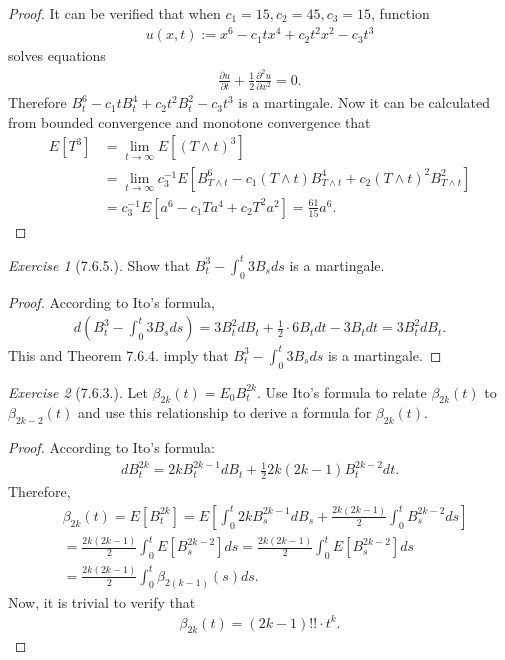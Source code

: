 \documentclass[12pt,a4paper]{amsart}
\theoremstyle{plain}
\theoremstyle{definition}
\theoremstyle{remark}
\newtheorem*{exe}{Exercise}
\numberwithin{equation}{section}
\begin{document}
\begin{proof}
It can be verified that when $c_1 = 15, c_2 = 45, c_3 = 15$, function 
\begin{align}
u(x,t):= x^6 - c_1 tx^4 + c_2 t^2 x^2 - c_3 t^3
\end{align}
solves equations
\begin{align}
\frac{\partial u}{\partial t} + \frac{1}{2} \frac{\partial^2 u}{ \partial x^2} = 0.
\end{align}
Therefore $B_t^6 - c_1tB_t^4+c_2t^2B_t^2-c_3t^3$ is a martingale.
Now it can be calculated from bounded convergence and monotone convergence that
\begin{align}
  E\left[ T^3 \right]
&= \lim_{t\to \infty} E\left[(T\wedge t)^3\right] 
  \\& =\lim_{t\to \infty} c_3^{-1}E\left[ B_{T\wedge t}^6 - c_1(T\wedge t)B_{T\wedge t}^4+c_2(T\wedge t)^2 B_{T\wedge t}^2 \right]
  \\& = c_3^{-1}E\left[ a^6 - c_1Ta^4+c_2T^2a^2 \right]
= \frac{61}{15}a^6.
\end{align}
\end{proof}
\begin{exe}[7.6.5.]
Show that $B_t^3 - \int_0^t 3B_s ds$ is a martingale.
\end{exe}
\begin{proof}
According to Ito's formula,
\begin{align}
 d\left( B_t^3 - \int_0^t 3 B_s ds \right)
= 3B_t^2 dB_t + \frac{1}{2} \cdot 6 B_t dt - 3 B_t dt
= 3 B_t^2 dB_t.
\end{align}
This and Theorem 7.6.4. imply that $B_t^3 - \int_0^t 3B_sds$ is a martingale.
\end{proof}
\begin{exe}[7.6.3.]
Let $\beta_{2k}(t) = E_0 B_t^{2k}$. 
Use Ito's formula to relate $\beta_{2k}(t)$ to $\beta_{2k-2}(t)$ and use this relationship to derive a formula for $\beta_{2k}(t)$.
\end{exe}
\begin{proof}
According to Ito's formula:
\begin{align}
dB_t^{2k} = 2k B_t^{2k - 1} dB_t + \frac{1}{2} 2k(2k-1) B_t^{2k-2} dt.
\end{align}
Therefore,
\begin{align}
  &\beta_{2k}(t) 
= E\left[ B_t^{2k} \right] 
   = E\left[ \int_0^t 2k B_s^{2k - 1} dB_s + \frac{2k(2k-1)}{2} \int_0^t B_s^{2k-2} ds \right]
  \\& = \frac{2k(2k-1)}{2} \int_0^t E\left[  B_s^{2k-2}  \right] ds
  = \frac{2k(2k-1)}{2} \int_0^t E\left[  B_s^{2k-2}  \right] ds
  \\&= \frac{2k(2k-1)}{2} \int_0^t \beta_{2(k-1)}(s) ds.
\end{align}
Now, it is trivial to verify that 
\begin{align}
\beta_{2k}(t) = (2k-1)!!\cdot t^{k}.
\end{align} 
\end{proof}
\end{document}
